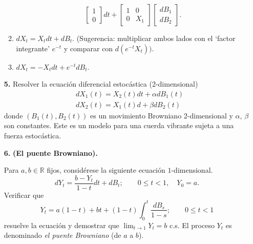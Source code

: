 \documentclass[letterpaper]{article}
\newcommand{\R}{\mathbb{R}}
\renewcommand{\to}{\rightarrow}
\newcommand{\1}{\mathds{1}}
\theoremstyle{definition}
\theoremstyle{definition}
\theoremstyle{definition}
\theoremstyle{definition}
\theoremstyle{definition}
\begin{document}
\begin{enumerate}
\begin{enumerate}
\[\begin{bmatrix}
            1\\
            0
        \end{bmatrix}dt + \begin{bmatrix}
            1 & 0\\
            0 & X_1
        \end{bmatrix} \begin{bmatrix}
            dB_1\\
            dB_2
        \end{bmatrix}.
        \]
        \item $dX_t=X_tdt + dB_t$. (Sugerencia: multiplicar ambos lados con el `factor integrante' $e^{-t}$
        y comparar con $d(e^{-t}X_t))$.
        \item $dX_t=-X_tdt+e^{-t}dB_t$.
    \end{enumerate}
    \item[\textbf{5.}] Resolver la ecuación diferencial estocástica (2-dimensional)
    \begin{align*}
        &dX_1(t)=X_2(t)dt+\alpha dB_1(t)\\
        &dX_2(t)=X_1(t)d+\beta dB_2(t)
    \end{align*}
    donde $(B_1(t),B_2(t))$ es un movimiento Browniano 2-dimensional y $\alpha$, $\beta$ son constantes.
    Este es un modelo para una cuerda vibrante sujeta a una fuerza estocástica.
    \item[\textbf{6.}] \textbf{(El puente Browniano).}
    
    Para $a,b\in \R$ fijos, considérese la siguiente ecuación $1$-dimensional.
    \[
    dY_t=\frac{b-Y_t}{1-t}dt+dB_t; \qquad 0\leq t<1, \quad Y_0=a.    
    \]
    Verificar que 
    \[
    Y_t=a(1-t) + bt + (1-t)\int_{0}^{t}\frac{dB_s}{1-s}; \qquad 0\leq t <1    
    \]
    resuelve la ecuación y demostrar que $\displaystyle \lim_{t\to 1}Y_t=b$ c.s. El proceso 
    $Y_t$ es denominado \textit{el puente Browniano} (de $a$ a $b$).
\end{enumerate}
\end{document}
